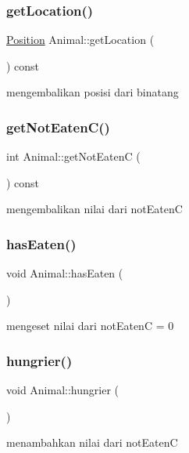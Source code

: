 \subsubsection{\texorpdfstring{getLocation()}{getLocation()}}
{\footnotesize\ttfamily \mbox{\hyperlink{class_position}{Position}} Animal\+::get\+Location (\begin{DoxyParamCaption}{ }\end{DoxyParamCaption}) const}

mengembalikan posisi dari binatang \mbox{\label{class_animal_a0626ecd506a6207325f306b460c9b675}} 
\subsubsection{\texorpdfstring{getNotEatenC()}{getNotEatenC()}}
{\footnotesize\ttfamily int Animal\+::get\+Not\+EatenC (\begin{DoxyParamCaption}{ }\end{DoxyParamCaption}) const}

mengembalikan nilai dari not\+EatenC \mbox{\label{class_animal_a1254bfc5dd49c9c4ba4b4a2e2f798943}} 
\subsubsection{\texorpdfstring{hasEaten()}{hasEaten()}}
{\footnotesize\ttfamily void Animal\+::has\+Eaten (\begin{DoxyParamCaption}{ }\end{DoxyParamCaption})}

mengeset nilai dari not\+EatenC = 0 \mbox{\label{class_animal_aa55a8fca7fa44c07cf201882bafd9762}} 
\subsubsection{\texorpdfstring{hungrier()}{hungrier()}}
{\footnotesize\ttfamily void Animal\+::hungrier (\begin{DoxyParamCaption}{ }\end{DoxyParamCaption})}

menambahkan nilai dari not\+EatenC \mbox{\label{class_animal_a8e99d809fbff9cea27dee5a785932dc6}} 
